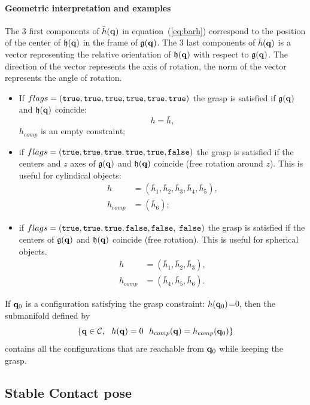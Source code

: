 \paragraph{Geometric interpretation and examples}
The 3 first components of $\bar{h}(\mathbf{q})$ in equation~(\ref{eq:barh}) correspond to the position of the center of $\mathfrak{h}(\mathbf{q})$ in the frame of $\mathfrak{g}(\mathbf{q})$. The 3 last components of $\bar{h}(\mathbf{q})$ is a vector representing the relative orientation of $\mathfrak{h}(\mathbf{q})$ with respect to $\mathfrak{g}(\mathbf{q})$. The direction of the vector represents the axis of rotation, the norm of the vector represents the angle of rotation.
\begin{itemize}
\item If $flags=(\texttt{true},\texttt{true},\texttt{true},\texttt{true},\texttt{true},\texttt{true})$ the grasp is satisfied if $\mathfrak{g}(\mathbf{q})$ and $\mathfrak{h}(\mathbf{q})$ coincide:
  $$ h =\bar{h},$$
  $h_{comp}$ is an empty constraint;
\item if $flags=(\texttt{true},\texttt{true},\texttt{true},\texttt{true},\texttt{true},\texttt{false})$ the grasp is satisfied if the centers and $z$ axes of $\mathfrak{g}(\mathbf{q})$ and $\mathfrak{h}(\mathbf{q})$ coincide (free rotation around $z$). This is useful for cylindical objects:
  \begin{align*}
    h &= (\bar{h}_1,\bar{h}_2,\bar{h}_3,\bar{h}_4,\bar{h}_5),\\
    h_{comp} &= (\bar{h}_6);
  \end{align*}
\item if $flags=(\texttt{true},\texttt{true},\texttt{true},\texttt{false},\texttt{false},$ $\texttt{false})$ the grasp is satisfied if the centers of $\mathfrak{g}(\mathbf{q})$ and $\mathfrak{h}(\mathbf{q})$ coincide (free rotation). This is useful for spherical objects.
  \begin{align*}
    h &= (\bar{h}_1,\bar{h}_2,\bar{h}_3),\\
    h_{comp} &= (\bar{h}_4,\bar{h}_5,\bar{h}_6).
  \end{align*}
\end{itemize}
If $\mathbf{q}_0$ is a configuration satisfying the grasp constraint: $h(\mathbf{q}_0)$=0, then the submanifold defined by
$$
\left\{\conf\in\CS,\ \ h(\conf)=0\ \ h_{comp}(\conf) =  h_{comp}(\conf_0)\right\}
$$
contains all the configurations that are reachable from $\mathbf{q}_0$ while keeping the grasp.

\subsection{Stable Contact pose}\label{subsec:placement}

